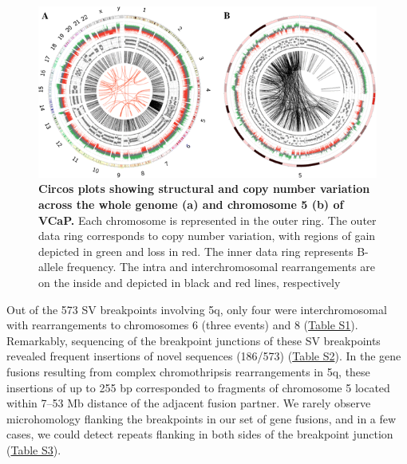 \begin{figure}
    \includegraphics[width=\textwidth]{chapters/images/vcap/circosplots.png}
    \caption{\textbf{Circos plots showing structural and copy number variation across the whole genome (a) and chromosome 5 (b) of VCaP.} Each chromosome is represented
in the outer ring. The outer data ring corresponds to copy number variation, with regions of gain depicted in green and loss in red. The inner data ring
represents B-allele frequency. The intra and interchromosomal rearrangements are on the inside and depicted in black and red lines, respectively}\label{fig:vcap-circos}
\end{figure}


Out of the 573 SV breakpoints involving 5q, only four were interchromosomal with rearrangements to chromosomes 6 (three events) and 8 (\href{https://link.springer.com/article/10.1007/s00439-013-1308-1#SupplementaryMaterial}{Table S1}). Remarkably,
sequencing of the breakpoint junctions of these SV breakpoints revealed frequent insertions of novel sequences (186/573) (\href{https://link.springer.com/article/10.1007/s00439-013-1308-1#SupplementaryMaterial}{Table S2}). In the gene fusions
resulting from complex chromothripsis rearrangements in 5q, these insertions of up to 255 bp corresponded to fragments of chromosome 5 located within 7–53
Mb distance of the adjacent fusion partner. We rarely observe microhomology flanking the breakpoints in our set of gene fusions, and in a few cases,
we could detect repeats flanking in both sides of the breakpoint junction (\href{https://link.springer.com/article/10.1007/s00439-013-1308-1#SupplementaryMaterial}{Table S3}).


